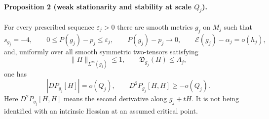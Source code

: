 \paragraph{Proposition 2 (weak stationarity and stability at scale $Q_j$).}
For every prescribed sequence $\varepsilon_j>0$ there are smooth metrics
$g_j$ on $M_j$ such that
\[
 s_{g_j}=-4,\qquad 0\le P(g_j)-p_j\le\varepsilon_j,
 \qquad P(g_j)-p_j\longrightarrow0,
 \qquad \mathcal E(g_j)-\alpha_j=o(h_j),
\]
and, uniformly over all smooth symmetric two-tensors satisfying
\[
 \|H\|_{L^\infty(g_j)}\le1,\qquad
 \mathfrak D_{g_j}(H)\le A_j,
\]
one has
\begin{equation}
 |DP_{g_j}[H]|=o(Q_j),\qquad
 D^2P_{g_j}[H,H]\ge-o(Q_j).
 \label{eq:o11-var-selection-20260929}
\end{equation}
Here $D^2P_{g_j}[H,H]$ means the second derivative along $g_j+tH$.
It is not being identified with an intrinsic Hessian at an assumed
critical point.

